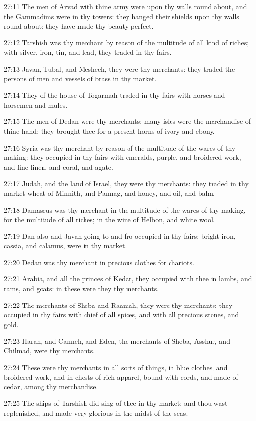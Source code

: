 27:11 The men of Arvad with thine army were upon thy walls round
about, and the Gammadims were in thy towers: they hanged their shields
upon thy walls round about; they have made thy beauty perfect.

27:12 Tarshish was thy merchant by reason of the multitude of all kind
of riches; with silver, iron, tin, and lead, they traded in thy fairs.

27:13 Javan, Tubal, and Meshech, they were thy merchants: they traded
the persons of men and vessels of brass in thy market.

27:14 They of the house of Togarmah traded in thy fairs with horses
and horsemen and mules.

27:15 The men of Dedan were thy merchants; many isles were the
merchandise of thine hand: they brought thee for a present horns of
ivory and ebony.

27:16 Syria was thy merchant by reason of the multitude of the wares
of thy making: they occupied in thy fairs with emeralds, purple, and
broidered work, and fine linen, and coral, and agate.

27:17 Judah, and the land of Israel, they were thy merchants: they
traded in thy market wheat of Minnith, and Pannag, and honey, and oil,
and balm.

27:18 Damascus was thy merchant in the multitude of the wares of thy
making, for the multitude of all riches; in the wine of Helbon, and
white wool.

27:19 Dan also and Javan going to and fro occupied in thy fairs:
bright iron, cassia, and calamus, were in thy market.

27:20 Dedan was thy merchant in precious clothes for chariots.

27:21 Arabia, and all the princes of Kedar, they occupied with thee in
lambs, and rams, and goats: in these were they thy merchants.

27:22 The merchants of Sheba and Raamah, they were thy merchants: they
occupied in thy fairs with chief of all spices, and with all precious
stones, and gold.

27:23 Haran, and Canneh, and Eden, the merchants of Sheba, Asshur, and
Chilmad, were thy merchants.

27:24 These were thy merchants in all sorts of things, in blue
clothes, and broidered work, and in chests of rich apparel, bound with
cords, and made of cedar, among thy merchandise.

27:25 The ships of Tarshish did sing of thee in thy market: and thou
wast replenished, and made very glorious in the midst of the seas.

